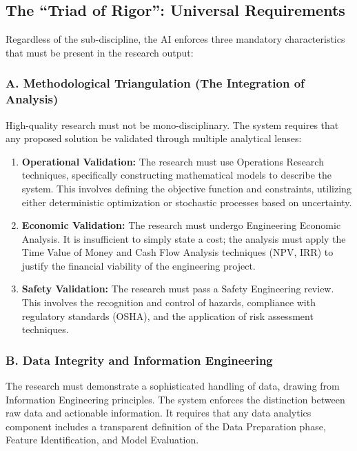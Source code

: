 \documentclass[12pt,a4paper]{article}
\begin{document}
\subsection{The ``Triad of Rigor'': Universal Requirements}

Regardless of the sub-discipline, the AI enforces three mandatory characteristics that must be present in the research output:

\subsubsection{A. Methodological Triangulation (The Integration of Analysis)}

High-quality research must not be mono-disciplinary. The system requires that any proposed solution be validated through multiple analytical lenses:

\begin{enumerate}[leftmargin=*]
    \item \textbf{Operational Validation:} The research must use Operations Research techniques, specifically constructing mathematical models to describe the system. This involves defining the objective function and constraints, utilizing either deterministic optimization or stochastic processes based on uncertainty.
    
    \item \textbf{Economic Validation:} The research must undergo Engineering Economic Analysis. It is insufficient to simply state a cost; the analysis must apply the Time Value of Money and Cash Flow Analysis techniques (NPV, IRR) to justify the financial viability of the engineering project.
    
    \item \textbf{Safety Validation:} The research must pass a Safety Engineering review. This involves the recognition and control of hazards, compliance with regulatory standards (OSHA), and the application of risk assessment techniques.
\end{enumerate}

\subsubsection{B. Data Integrity and Information Engineering}

The research must demonstrate a sophisticated handling of data, drawing from Information Engineering principles. The system enforces the distinction between raw data and actionable information. It requires that any data analytics component includes a transparent definition of the Data Preparation phase, Feature Identification, and Model Evaluation.
\end{document}
